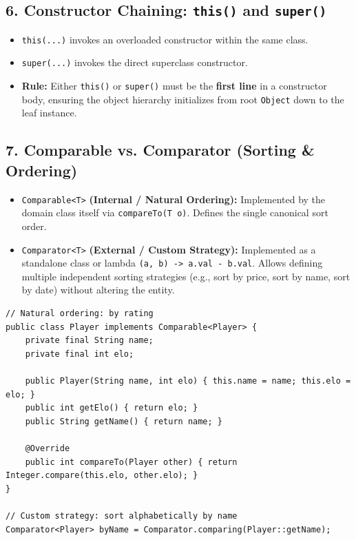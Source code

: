 \documentclass[10pt,journal,compsoc,onecolumn]{IEEEtran}
\begin{document}
\subsection{6. Constructor Chaining: \texttt{this()} and \texttt{super()}}
\begin{itemize}
    \item \texttt{this(...)} invokes an overloaded constructor within the same class.
    \item \texttt{super(...)} invokes the direct superclass constructor.
    \item \textbf{Rule:} Either \texttt{this()} or \texttt{super()} must be the \textbf{first line} in a constructor body, ensuring the object hierarchy initializes from root \texttt{Object} down to the leaf instance.
\end{itemize}

\subsection{7. Comparable vs. Comparator (Sorting \& Ordering)}
\begin{itemize}
    \item \texttt{Comparable<T>} \textbf{(Internal / Natural Ordering):} Implemented by the domain class itself via \texttt{compareTo(T o)}. Defines the single canonical sort order.
    \item \texttt{Comparator<T>} \textbf{(External / Custom Strategy):} Implemented as a standalone class or lambda \texttt{(a, b) -> a.val - b.val}. Allows defining multiple independent sorting strategies (e.g., sort by price, sort by name, sort by date) without altering the entity.
\end{itemize}

\begin{verbatim}
// Natural ordering: by rating
public class Player implements Comparable<Player> {
    private final String name;
    private final int elo;

    public Player(String name, int elo) { this.name = name; this.elo = elo; }
    public int getElo() { return elo; }
    public String getName() { return name; }

    @Override
    public int compareTo(Player other) { return Integer.compare(this.elo, other.elo); }
}

// Custom strategy: sort alphabetically by name
Comparator<Player> byName = Comparator.comparing(Player::getName);
\end{verbatim}
\end{document}
